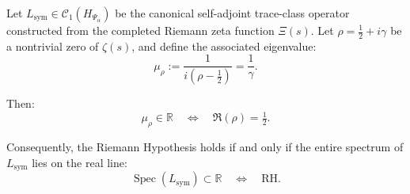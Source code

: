 \begin{lemma}
\label{lem:reality_of_spectrum_and_rh}
Let \( L_{\mathrm{sym}} \in \mathcal{C}_1(H_{\Psi_\alpha}) \) be the canonical self-adjoint trace-class operator constructed from the completed Riemann zeta function \( \Xi(s) \). Let \( \rho = \tfrac{1}{2} + i\gamma \) be a nontrivial zero of \( \zeta(s) \), and define the associated eigenvalue:
\[
\mu_\rho := \frac{1}{i(\rho - \tfrac{1}{2})} = \frac{1}{\gamma}.
\]

Then:
\[
\mu_\rho \in \mathbb{R} \quad \Longleftrightarrow \quad \Re(\rho) = \tfrac{1}{2}.
\]

\medskip
\noindent
Consequently, the Riemann Hypothesis holds if and only if the entire spectrum of \( L_{\mathrm{sym}} \) lies on the real line:
\[
\operatorname{Spec}(L_{\mathrm{sym}}) \subset \mathbb{R} \quad \Longleftrightarrow \quad \mathrm{RH}.
\]
\end{lemma}
% 
